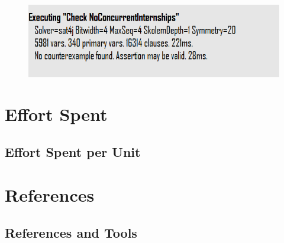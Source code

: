 \documentclass{article}
\begin{document}
\begin{figure}[H]
    \centering
    \includegraphics[width=1\textwidth]{figures/alloy/assertion.png}
    \centering
\end{figure}
\section{Effort Spent}
\subsection{Effort Spent per Unit}

\section{References}
\subsection{References and Tools}

\maketitle
\end{document}
